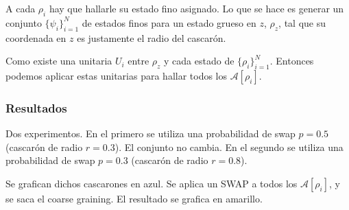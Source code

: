 \documentclass[onecolumn,11pt]{article}
\newcommand{\mcA}{\mathcal{A}}
\begin{document}
A cada $\rho_{i}$ hay que hallarle su estado fino asignado. Lo que se hace es generar un conjunto $\{\psi_{i}\}_{i=1}^{N}$ de estados finos para un estado grueso en $z$, $\rho_{z}$, tal que su coordenada en $z$ es justamente el radio del cascarón.

Como existe una unitaria $U_{i}$ entre $\rho_{z}$ y cada estado de $\{\rho_{i}\}_{i=1}^{N}$. Entonces podemos aplicar estas unitarias para hallar todos los $\mcA[\rho_{i}]$.

\subsubsection{Resultados}

Dos experimentos. En el primero se utiliza una probabilidad de swap $p=0.5$ (cascarón de radio $r=0.3$). El conjunto no cambia. En el segundo se utiliza una probabilidad de swap $p=0.3$ (cascarón de radio $r=0.8$).

Se grafican dichos cascarones en azul. Se aplica un SWAP a todos los $\mcA[\rho_{i}]$, y se saca el coarse graining. El resultado se grafica en amarillo.
\end{document}
